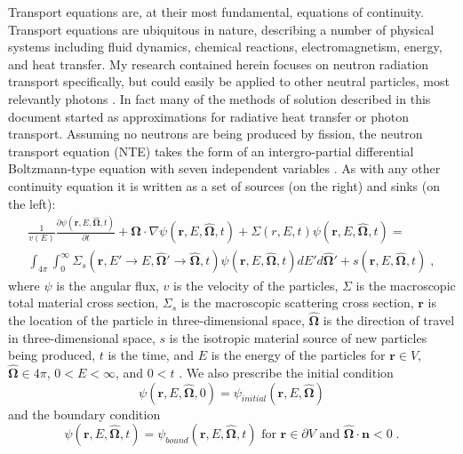 Transport equations are, at their most fundamental, equations of continuity.
Transport equations are ubiquitous in nature, describing a number of physical systems including fluid dynamics, chemical reactions, electromagnetism, energy, and heat transfer.
My research contained herein focuses on neutron radiation transport specifically, but could easily be applied to other neutral particles, most relevantly photons \cite{radheattrans2003, chandrasekhar1960radiative}.
In fact many of the methods of solution described in this document started as approximations for radiative heat transfer or photon transport.
Assuming no neutrons are being produced by fission, the neutron transport equation (NTE) takes the form of an intergro-partial differential Boltzmann-type equation with seven independent variables \cite{duderstadt_hamilton}.
As with any other continuity equation it is written as a set of sources (on the right) and sinks (on the left):
\begin{multline}
    \label{eq:fullNTE}
    \frac{1}{v(E)}\frac{\partial \psi(\boldsymbol{r}, E, \boldsymbol{\hat{\Omega}},t)}{\partial t} + \boldsymbol{\hat{\Omega}} \cdot \nabla \psi(\boldsymbol{r}, E, \boldsymbol{\hat{\Omega}},t) + \Sigma(r, E, t) \psi(\boldsymbol{r}, E, \boldsymbol{\hat{\Omega}},t) = \\
    \int_{4\pi}\int_{0}^{\infty}\Sigma_s(\boldsymbol{r}, E'\rightarrow E, \boldsymbol{\hat{\Omega}'} \rightarrow \boldsymbol{\hat{\Omega}}, t)
    \psi(\boldsymbol{r}, E, \boldsymbol{\hat{\Omega}},t) dE' d\boldsymbol{\hat{\Omega}'} +
    s(\boldsymbol{r}, E, \boldsymbol{\hat{\Omega}},t) \;,
\end{multline}
where $\psi$ is the angular flux, $v$ is the velocity of the particles, $\Sigma$ is the macroscopic total material cross section, $\Sigma_s$ is the macroscopic scattering cross section, $\boldsymbol{r}$ is the location of the particle in three-dimensional space, $\boldsymbol{\hat{\Omega}}$ is the direction of travel in three-dimensional space, $s$ is the isotropic material source of new particles being produced, $t$ is the time, and $E$ is the energy of the particles for $\boldsymbol{r} \in V$, $\boldsymbol{\hat{\Omega}} \in 4\pi$, $0<E<\infty$, and $0<t$ \cite{duderstadt_hamilton}. We also prescribe the initial condition
\begin{equation}
    \psi(\boldsymbol{r}, E, \boldsymbol{\hat{\Omega}},0) = \psi_{initial}(\boldsymbol{r}, E, \boldsymbol{\hat{\Omega}})
\end{equation}
and the boundary condition
\begin{equation}
    \psi(\boldsymbol{r}, E, \boldsymbol{\hat{\Omega}},t) = \psi_{bound}(\boldsymbol{r}, E, \boldsymbol{\hat{\Omega}},t) \text{ for } \boldsymbol{r} \in \partial V \text{ and } \boldsymbol{\hat{\Omega}} \cdot \boldsymbol{n} < 0 \;.
\end{equation}
